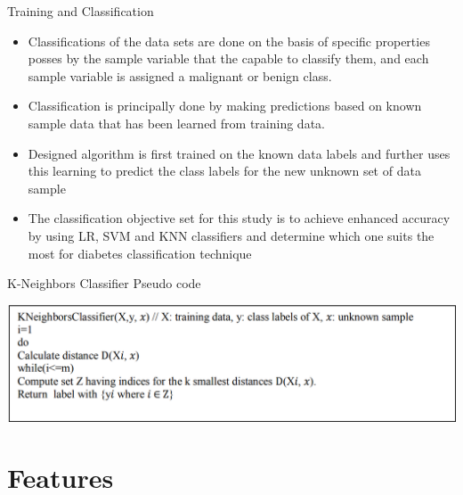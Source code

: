\documentclass{SKP-beamer}
\begin{document}
\begin{frame}{Training and Classification}
	\begin{itemize}
		\item Classifications of the data sets are done on the basis of specific properties posses by the sample variable that the capable to classify them, and each sample variable is assigned a malignant or benign class.
		\item Classification is principally done by making predictions based on known sample data that has been learned from training data. 
		\item Designed algorithm is first trained on the known data labels and further uses this learning to predict the class labels for the new unknown set of data sample
		\item The classification objective set for this study is to achieve enhanced accuracy by using LR, SVM and KNN classifiers and determine which one suits the most for diabetes classification technique
	\end{itemize}
\end{frame}


\begin{frame}{K-Neighbors Classifier Pseudo code}
	\begin{center}
		\includegraphics[scale=0.48]{2.png}
	\end{center}
\end{frame}

\section{\textbf{Features}}
\end{document}
